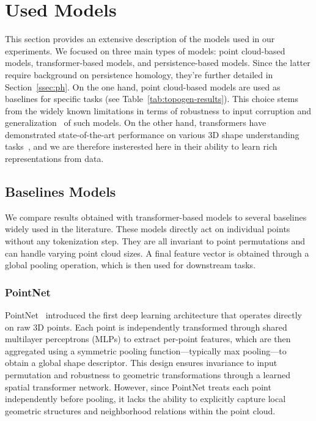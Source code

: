 \section{Used Models}
\label{sec:used_models}


This section provides an extensive description of the models used in our experiments. We focused on three main types of models: point cloud-based models, transformer-based models, and persistence-based models. Since the latter require background on persistence homology, they're further detailed in Section~\ref{ssec:ph}. On the one hand, point cloud-based models are used as baselines for specific tasks (see Table~\ref{tab:topogen-results}). This choice stems from the widely known limitations in terms of robustness to input corruption and generalization~\cite{set-transformer} of such models. On the other hand, transformers have demonstrated state-of-the-art performance on various 3D shape understanding tasks~\cite{pbert,pmae,pm2ae,pcpmae}, and we are therefore insterested here in their ability to learn rich representations from data.

\subsection{Baselines Models}
\label{ssec:baselines_models}

We compare results obtained with transformer-based models to several baselines widely used in the literature. These models directly act on individual points without any tokenization step. They are all invariant to point permutations and can handle varying point cloud sizes. A final feature vector is obtained through a global pooling operation, which is then used for downstream tasks.

\subsubsection{PointNet}

PointNet~\cite{pointnet} introduced the first deep learning architecture that operates directly on raw 3D points. Each point is independently transformed through shared multilayer perceptrons (MLPs) to extract per-point features, which are then aggregated using a symmetric pooling function—typically max pooling—to obtain a global shape descriptor. This design ensures invariance to input permutation and robustness to geometric transformations through a learned spatial transformer network. However, since PointNet treats each point independently before pooling, it lacks the ability to explicitly capture local geometric structures and neighborhood relations within the point cloud.

